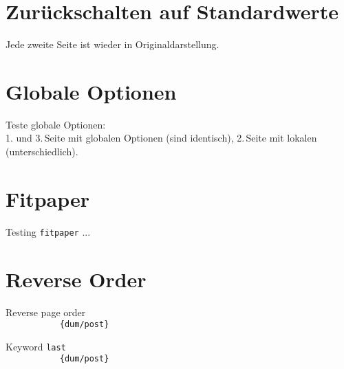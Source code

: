 \documentclass[a4paper]{article}
\begin{document}
\Huge




\begingroup
\section{Zur\"uckschalten auf Standardwerte}
Jede zweite Seite ist wieder in Originaldarstellung.











\endgroup

\begingroup
\section{Globale Optionen}
Teste globale Optionen:\\
1. und 3.\,Seite mit globalen Optionen (sind identisch),
2.\,Seite mit lokalen (unterschiedlich).




\endgroup


\section{Fitpaper}
\begingroup
Testing \texttt{fitpaper} ...

\endgroup


\section{Reverse Order}
\begingroup
Reverse page order\\
\verb||
\verb|           {dum/post}|

Keyword \verb|last|\\
\verb||
\verb|           {dum/post}|

\endgroup
\end{document}
